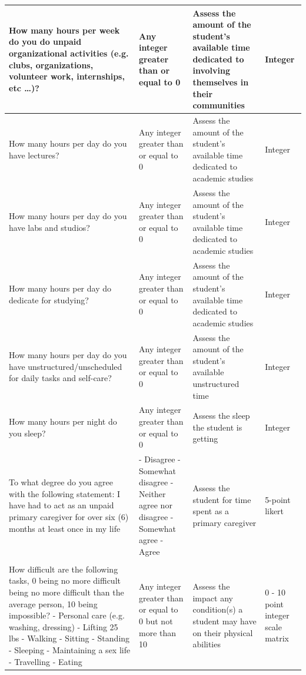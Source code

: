\documentclass[10pt, twocolumn]{article}
\begin{document}
\begin{xltabular}{\textwidth}{|p{0.3\textwidth}|p{0.3\textwidth}|p{0.2\textwidth}|X|}
    How many hours per week do you do unpaid organizational activities (e.g. clubs, organizations, volunteer work, internships, etc \dots)? & Any integer greater than or equal to 0 & Assess the amount of the student's available time dedicated to involving themselves in their communities & Integer \\ \hline 
    How many hours per day do you have lectures? & Any integer greater than or equal to 0 & Assess the amount of the student's available time dedicated to academic studies & Integer \\ \hline 
    How many hours per day do you have labs and studios? & Any integer greater than or equal to 0 & Assess the amount of the student's available time dedicated to academic studies & Integer \\ \hline 
    How many hours per day do dedicate for studying? & Any integer greater than or equal to 0 & Assess the amount of the student's available time dedicated to academic studies & Integer \\ \hline 
    How many hours per day do you have unstructured/unscheduled for daily tasks and self-care? & Any integer greater than or equal to 0 & Assess the amount of the student's available unstructured time & Integer \\ \hline 
    How many hours per night do you sleep? & Any integer greater than or equal to 0 & Assess the sleep the student is getting & Integer \\ \hline
    To what degree do you agree with the following statement: \newline I have had to act as an unpaid primary caregiver for over six (6) months at least once in my life & - Disagree \newline - Somewhat disagree \newline - Neither agree nor disagree \newline - Somewhat agree \newline - Agree & Assess the student for time spent as a primary caregiver & 5-point likert \\ \hline
    \hline 
     \\ \hline
    How difficult are the following tasks, 0 being no more difficult being no more difficult than the average person, 10 being impossible? \newline - Personal care (e.g. washing, dressing) \newline - Lifting 25 lbs \newline - Walking \newline - Sitting \newline - Standing \newline - Sleeping \newline - Maintaining a sex life \newline - Travelling \newline - Eating & Any integer greater than or equal to 0 but not more than 10 & Assess the impact any condition(s) a student may have on their physical abilities & 0 - 10 point integer scale matrix \\ \hline

\end{xltabular}
\end{document}
